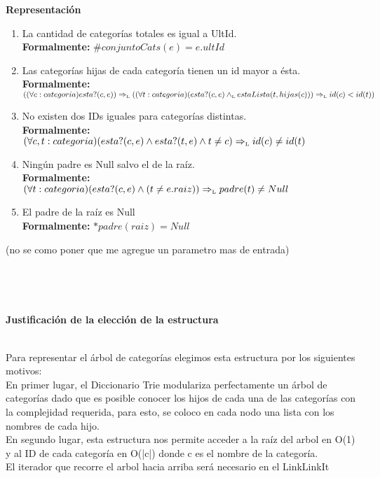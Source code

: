 \documentclass[10pt, a4paper]{article}
\newenvironment{Representacion}{%
  \vspace*{2ex}%
  \noindent\textbf{\Large Representaci\'on}%
  \vspace*{2ex}%
}{}
\newenvironment{Servicios Usados}{%
  \vspace*{2ex}
  \noindent\textbf{\Large Servicios Usados}%
  \vspace*{2ex}
}{}
\newenvironment{Algoritmos Del Iterador}{%
  \vspace*{2ex}%
  \noindent\textbf{\Large Algoritmos Del Iterador}%
  \vspace*{2ex}%
}{}
\newenvironment{Justificacion}{%
  \vspace*{2ex}%
  \noindent\textbf{\Large Justificaci\'on de la elecci\'on de la estructura}%
  \vspace*{2ex}%
}{}
\begin{document}
\begin{Representacion}
\begin{enumerate}
  \item La cantidad de categor\'ias totales es igual a UltId.\\
        {\bf Formalmente:} $\#conjuntoCats(e) = e.ultId$
  
  \item Las categor\'ias hijas de cada categor\'ia tienen un id mayor a \'esta.\\
        {\bf Formalmente:} $((\forall c:categoria)esta?(c,e)) \Rightarrow_{\mathrm{\scriptscriptstyle{L}}} ((\forall t:categoria)(esta?(c,e) \land_{\mathrm{\scriptscriptstyle{L}}} estaLista(t,hijas(c))) \Rightarrow_{\mathrm{\scriptscriptstyle{L}}} id(c) < id(t))$
  
  \item No existen dos IDs iguales para categor\'ias distintas.\\
        {\bf Formalmente:} $(\forall c,t:categoria)(esta?(c,e) \land esta?(t,e) \land t \not= c) \Rightarrow_{\mathrm{\scriptscriptstyle{L}}} id(c) \not =id(t)$
        
  \item Ningún padre es Null salvo el de la raíz. \\
  		{\bf Formalmente:} $(\forall t:categoria)(esta?(c,e) \land (t\not=e.raiz)) \Rightarrow_{\mathrm{\scriptscriptstyle{L}}} padre(t) \not= Null$
  		
  \item El padre de la raíz es Null  \\
  {\bf Formalmente:} $*padre(raiz) = Null$
  
    
\end{enumerate}


   (no se como poner que me agregue un parametro mas de entrada)
  \tadAxioma{}{}

  ~

  \tadAxioma{}{}

  ~
 

\end{Representacion}

\begin{Justificacion}
\\Para representar el árbol de categorías elegimos esta estructura por los siguientes motivos:
\\En primer lugar, el Diccionario Trie modulariza perfectamente un \'arbol de categor\'ias dado que es posible conocer los hijos de cada una de las categor\'ias con la complejidad requerida, para esto, se coloco en cada nodo una lista con los nombres de cada hijo. 
\\En segundo lugar, esta estructura nos permite acceder a la ra\'iz del arbol en O(1) y al ID de cada categor\'ia en O(|c|) donde c es el nombre de la categor\'ia.
\\El iterador que recorre el arbol hacia arriba será necesario en el LinkLinkIt
\end{Justificacion}
\end{document}
